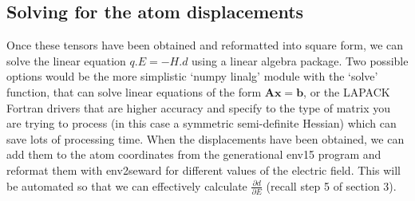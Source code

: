 \documentclass[10pt]{article}
\begin{document}
\subsection{Solving for the atom displacements}
Once these tensors have been obtained and reformatted into square form, we can solve the linear equation $q.E = -H.d$ using a linear algebra package. Two possible options would be the more simplistic `numpy linalg' module with the `solve' function, that can solve linear equations of the form $\mathbf{Ax} = \mathbf{b}$, or the LAPACK Fortran drivers that are higher accuracy and specify to the type of matrix you are trying to process (in this case a symmetric semi-definite Hessian) which can save lots of processing time. When the displacements have been obtained, we can add them to the atom coordinates from the generational env15 program and reformat them with env2seward for different values of the electric field. This will be automated so that we can effectively calculate $\frac{\partial d}{\partial E}$ (recall step 5 of section 3).



\end{document}
